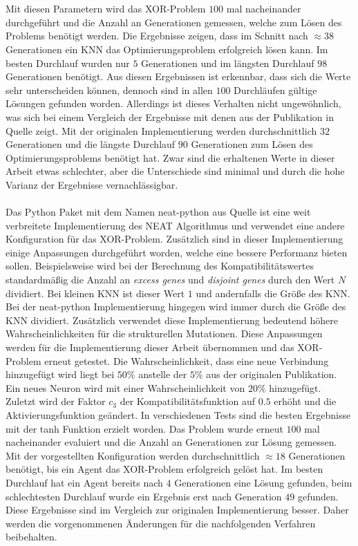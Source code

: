 \\\\
Mit diesen Parametern wird das XOR-Problem $100$ mal nacheinander durchgeführt und die Anzahl an Generationen gemessen, welche zum Lösen des Problems benötigt werden. Die Ergebnisse zeigen, dass im Schnitt nach $\approx 38$ Generationen ein \ac{KNN} das Optimierungsproblem erfolgreich lösen kann. Im besten Durchlauf wurden nur $5$ Generationen und im längsten Durchlauf $98$ Generationen benötigt. Aus diesen Ergebnissen ist erkennbar, dass sich die Werte sehr unterscheiden können, dennoch sind in allen $100$ Durchläufen gültige Lösungen gefunden worden. Allerdings ist dieses Verhalten nicht ungewöhnlich, was sich bei einem Vergleich der Ergebnisse mit denen aus der Publikation in Quelle \cite{stanley2002evolving} zeigt. Mit der originalen Implementierung werden durchschnittlich $32$ Generationen und die längste Durchlauf $90$ Generationen zum Lösen des Optimierungsproblems benötigt hat. Zwar sind die erhaltenen Werte in dieser Arbeit etwas schlechter, aber die Unterschiede sind minimal und durch die hohe Varianz der Ergebnisse vernachlässigbar.
\\\\
Das Python Paket mit dem Namen neat-python aus Quelle \cite{mcintyre_neatpython} ist eine weit verbreitete Implementierung des \ac{NEAT} Algorithmus und verwendet eine andere Konfiguration für das XOR-Problem. Zusätzlich sind in dieser Implementierung einige Anpassungen durchgeführt worden, welche eine bessere Performanz bieten sollen. Beispielsweise wird bei der Berechnung des Kompatibilitätswertes standardmäßig die Anzahl an \emph{excess genes} und \emph{disjoint genes} durch den Wert $N$ dividiert. Bei kleinen \ac{KNN} ist dieser Wert $1$ und andernfalls die Größe des \ac{KNN}. Bei der neat-python Implementierung hingegen wird immer durch die Größe des \ac{KNN} dividiert. Zusätzlich verwendet diese Implementierung bedeutend höhere Wahrscheinlichkeiten für die strukturellen Mutationen. Diese Anpassungen werden für die Implementierung dieser Arbeit übernommen und das XOR-Problem erneut getestet. Die Wahrscheinlichkeit, dass eine neue Verbindung hinzugefügt wird liegt bei $50\%$ anstelle der $5\%$ aus der originalen Publikation. Ein neues Neuron wird mit einer Wahrscheinlichkeit von $20\%$ hinzugefügt. Zuletzt wird der Faktor $c_3$ der Kompatibilitätsfunktion auf $0.5$ erhöht und die Aktivierungsfunktion geändert. In verschiedenen Tests sind die besten Ergebnisse mit der \ac{tanh} Funktion erzielt worden. Das Problem wurde erneut $100$ mal nacheinander evaluiert und die Anzahl an Generationen zur Lösung gemessen. Mit der vorgestellten Konfiguration werden durchschnittlich $\approx 18$ Generationen benötigt, bis ein Agent das XOR-Problem erfolgreich gelöst hat. Im besten Durchlauf hat ein Agent bereits nach $4$ Generationen eine Lösung gefunden, beim schlechtesten Durchlauf wurde ein Ergebnis erst nach Generation $49$ gefunden. Diese Ergebnisse sind im Vergleich zur originalen Implementierung besser. Daher werden die vorgenommenen Änderungen für die nachfolgenden Verfahren beibehalten.
